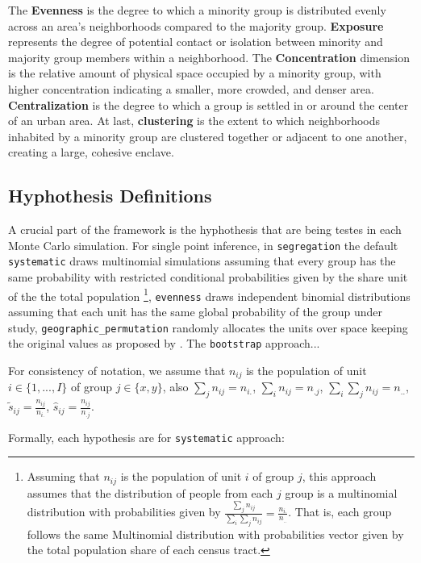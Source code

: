 \documentclass[12pt,a4paper]{article}
\begin{document}
The \textbf{Evenness} is the degree to which a minority group is distributed evenly across an area's neighborhoods compared to the majority group. \textbf{Exposure} represents the degree of potential contact or isolation between minority and majority group members within a neighborhood. The \textbf{Concentration} dimension is the relative amount of physical space occupied by a minority group, with higher concentration indicating a smaller, more crowded, and denser area.
\textbf{Centralization} is the degree to which a group is settled in or around the center of an urban area. At last, \textbf{clustering} is the extent to which neighborhoods inhabited by a minority group are clustered together or adjacent to one another, creating a large, cohesive enclave. 

\subsection{Hyphothesis Definitions}\label{subsec:infer_hyp}

A crucial part of the framework is the hyphothesis that are being testes in each Monte Carlo simulation. For single point inference, in \texttt{segregation} the default \texttt{systematic} draws multinomial simulations assuming that every group has the same probability with restricted conditional probabilities given by the share unit of the the total population \cite{allen2015more}\footnote{Assuming that $n_{ij}$ is the population of unit $i$ of group $j$, this approach assumes that the distribution of people from each $j$ group is a multinomial distribution with probabilities given by $\frac{\sum_{j}n_{ij}}{\sum_{i}\sum_{j}n_{ij}}=\frac{n_{i.}}{n_{..}}$. That is, each group follows the same Multinomial distribution with probabilities vector given by the total population share of each census tract.}, \texttt{evenness} draws independent binomial distributions assuming that each unit has the same global probability of the group under study, \texttt{geographic\_permutation} randomly allocates the units over space keeping the original values as proposed by \cite{rey2004spatial}. The \texttt{bootstrap} approach...


For consistency of notation, we assume that $n_{ij}$ is the population of unit $i \in \{1, ..., I\}$ of group $j \in \{x, y\}$, also $\sum_{j}n_{ij} = n_{i.}$, $\sum_{i}n_{ij} = n_{.j}$, $\sum_{i}\sum_{j}n_{ij} = n_{..}$, $\tilde{s}_{ij} = \frac{n_{ij}}{n_{i.}}$, $\hat{s}_{ij} = \frac{n_{ij}}{n_{.j}}$.

Formally, each hypothesis are for \texttt{systematic} approach:
\end{document}
